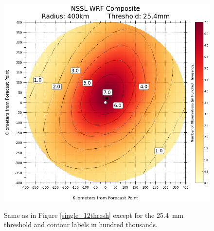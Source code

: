 \newpage
\begin{figure}[cc]
    \centering
    \includegraphics[width=35pc, angle=0]{./deterministic/figs/single_member_composite_400km_25-4mm.png}\\
    \caption{Same as in Figure \ref{single_12thresh} except for the \mbox{25.4 mm} threshold and contour labels in hundred thousands.}
    \label{single_25thresh}
\end{figure}


